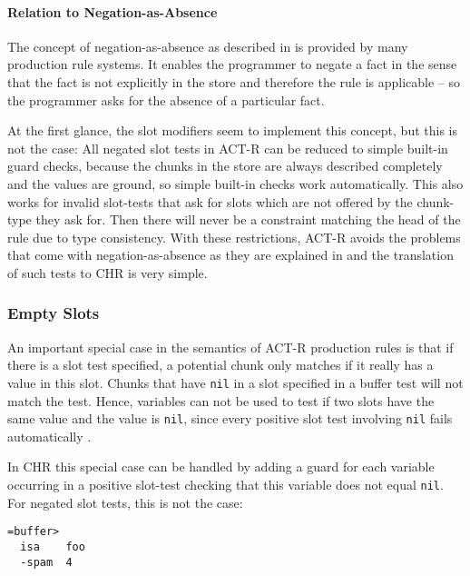\paragraph{Relation to Negation-as-Absence}

The concept of negation-as-absence as described in \cite[147\psqq]{fru_chr_book_2009} is provided by many production rule systems. It enables the programmer to negate a fact in the sense that the fact is not explicitly in the store and therefore the rule is applicable -- so the programmer asks for the absence of a particular fact.

At the first glance, the slot modifiers seem to implement this concept, but this is not the case: All negated slot tests in ACT-R can be reduced to simple built-in guard checks, because the chunks in the store are always described completely and the values are ground, so simple built-in checks work automatically. This also works for invalid slot-tests that ask for slots which are not offered by the chunk-type they ask for. Then there will never be a constraint matching the head of the rule due to type consistency. With these restrictions, ACT-R avoids the problems that come with negation-as-absence as they are explained in \cite[147\psqq]{fru_chr_book_2009} and the translation of such tests to CHR is very simple.

\subsubsection{Empty Slots}
\label{empty_slots}

An important special case in the semantics of ACT-R production rules is that if there is a slot test specified, a potential chunk only matches if it really has a value in this slot. Chunks that have \lstinline|nil| in a slot specified in a buffer test will not match the test. Hence, variables can not be used to test if two slots have the same value and the value is \lstinline|nil|, since every positive slot test involving \lstinline|nil| fails automatically \cite[p. 164, section ``Variables'', last sentence]{actr_reference}.

In CHR this special case can be handled by adding a guard for each variable occurring in a positive slot-test checking that this variable does not equal \lstinline|nil|. For negated slot tests, this is not the case: 

\begin{lstlisting}
=buffer>
  isa    foo
  -spam  4
\end{lstlisting}

